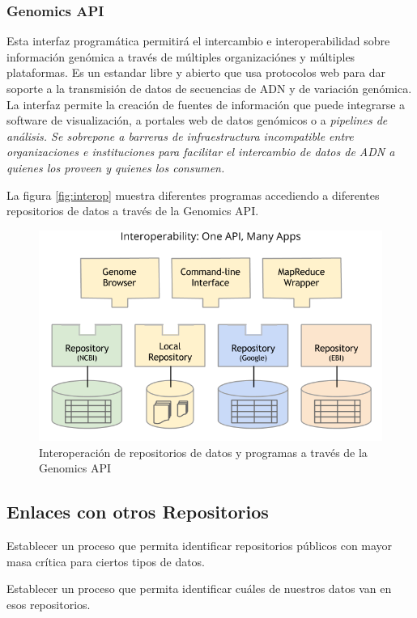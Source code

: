 \documentclass[
10pt, %
letterpaper, %
oneside, %
headinclude,footinclude, %
BCOR5mm, %
]{scrartcl}
\begin{document}
\subsubsection{Genomics API}

Esta interfaz programática permitirá el intercambio e
interoperabilidad sobre información genómica a través de múltiples
organizaciónes y múltiples plataformas. Es un estandar libre y abierto
que usa protocolos web para dar soporte a la transmisión de datos de
secuencias de ADN y de variación genómica. La interfaz permite la
creación de fuentes de información que puede integrarse a software de
visualización, a portales web de datos genómicos o a \em{pipelines}\em
de análisis. Se sobrepone a barreras de infraestructura incompatible
entre organizaciones e instituciones para facilitar el intercambio de
datos de ADN a quienes los proveen y quienes los consumen.\cite{_ga4gh_????-1}

La figura \vref{fig:interop} muestra diferentes programas accediendo a
diferentes repositorios de datos a través de la Genomics API.

\begin{figure}
\centering 
\includegraphics[width=0.8\columnwidth]{GA4GH_API_interop.png} 
\caption[]{Interoperación de repositorios de datos y programas a
  través de la Genomics API}
\label{fig:interop} 
\end{figure}



\subsection{Enlaces con otros Repositorios}
Establecer un proceso que permita identificar repositorios públicos
con mayor masa crítica para ciertos tipos de datos.

Establecer un proceso que permita identificar cuáles de nuestros datos
van en esos repositorios.
\cite{_genebank_????}
\cite{king_introduction_2007}
\end{document}
